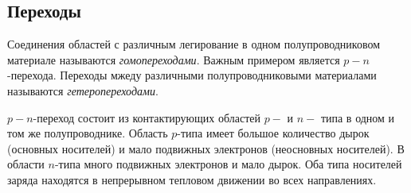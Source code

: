 \documentclass[a4paper, 12pt]{article}
\begin{document}
\subsection{Переходы}
Соединения областей с различным легирование в одном полупроводниковом
материале называются \emph{гомопереходами}. Важным примером является
$p-n$-перехода. Переходы мжеду различными полупроводниковыми
материалами называются \emph{гетеропереходами}. 

$p-n$-переход состоит из контактирующих областей $p-$ и $n-$ типа в
одном и том же полупроводнике. Область $p$-типа имеет большое
количество дырок (основных носителей) и мало подвижных электронов
(неосновных носителей). В области $n$-типа много подвижных электронов
и мало дырок. Оба типа носителей заряда находятся в непрерывном
тепловом движении во всех направлениях.
\end{document}
